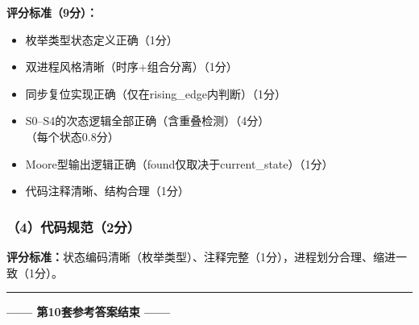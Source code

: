 \textbf{评分标准（9分）：}
\begin{itemize}
  \item 枚举类型状态定义正确\hfill（1分）
  \item 双进程风格清晰（时序+组合分离）\hfill（1分）
  \item 同步复位实现正确（仅在rising\_edge内判断）\hfill（1分）
  \item S0--S4的次态逻辑全部正确（含重叠检测）\hfill（4分）\\（每个状态0.8分）
  \item Moore型输出逻辑正确（found仅取决于current\_state）\hfill（1分）
  \item 代码注释清晰、结构合理\hfill（1分）
\end{itemize}

\subsubsection*{（4）代码规范（2分）}\hfill
\textbf{评分标准：}状态编码清晰（枚举类型）、注释完整（1分），进程划分合理、缩进一致（1分）。

\vspace{0.5cm}
{\centering
\rule{0.8\textwidth}{0.5pt}
\vspace{0.3cm}

\textbf{—— 第10套参考答案结束 ——}

\vspace{0.5cm}}

\endinput
